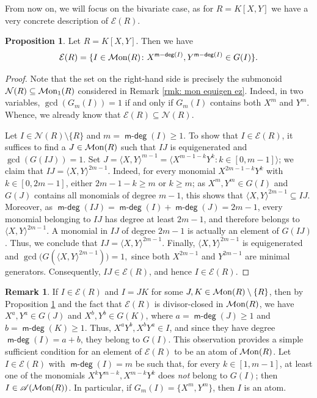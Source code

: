 \documentclass[a4paper,10pt,reqno]{amsart}
\theoremstyle{definition}
\newtheorem{proposition}[theorem]{Proposition}
\theoremstyle{definition}
\newtheorem{remark}[theorem]{Remark}
\providecommand\Mon{{\mathcal{M}{\rm on}}}
\DeclareMathOperator{\mdeg}{\mathsf {m-deg}}
\begin{document}
From now on, we will focus on the bivariate case, as for $R=K[X,Y]$ we have a very concrete description of $\mathcal E(R)$.

\begin{proposition}\label{prop: mon equigen bivar}
    Let $R=K[X,Y]$. Then we have
    \[ \mathcal E(R) = \{ I\in\Mon(R)\colon X^{\mdeg(I)},Y^{\mdeg(I)}\in G(I) \}. \]
\end{proposition}
\begin{proof}
    Note that the set on the right-hand side is precisely the submonoid $\mathcal N(R)\subseteq \Mon_1(R)$ considered in Remark \ref{rmk: mon equigen ez}. Indeed, in two variables, $\gcd(G_m(I))=1$ if and only if $G_m(I)$ contains both $X^m$ and $Y^m$. Whence, we already know that $\mathcal E(R)\subseteq\mathcal N(R)$. 

    Let $I\in\mathcal N(R)\setminus\{R\}$ and $m=\mdeg(I)\ge 1$. To show that $I\in\mathcal E(R)$, it suffices to find a $J\in\Mon(R)$ such that $IJ$ is equigenerated and $\gcd(G(IJ))=1$. Set  $J=\langle X,Y\rangle^{m-1}=\langle X^{m-1-k}Y^k\colon k\in [0,m-1]\rangle$; we claim that $IJ=\langle X,Y\rangle^{2m-1}$. Indeed, for every monomial $X^{2m-1-k}Y^k$ with $k\in [0,2m-1]$, either $2m-1-k\ge m$ or $k\ge m$;
    as $X^m,Y^m\in G(I)$ and $G(J)$ contains all monomials %
    of degree $m-1$, this shows that $\langle X,Y\rangle^{2m-1}\subseteq IJ$. Moreover, as $\mdeg(IJ)=\mdeg(I)+\mdeg(J)=2m-1$, every monomial belonging to $IJ$ has degree at least $2m-1$, and therefore belongs to $\langle X,Y\rangle^{2m-1}$. A monomial in $IJ$ of degree $2m-1$ is actually an element of $G(IJ)$. Thus,
    we conclude that $IJ=\langle X,Y\rangle^{2m-1}$. Finally, $\langle X,Y\rangle^{2m-1}$ is equigenerated and $\gcd\bigl(G(\langle X,Y\rangle^{2m-1})\bigr)=1,$ since both $X^{2m-1}$ and $Y^{2m-1}$ are minimal generators. Consequently, $IJ\in\mathcal E(R)$, and hence $I\in\mathcal E(R)$.
\end{proof}

\begin{remark}\label{rmk: diagonal atoms}
    If $I\in\mathcal E(R)$ and $I=JK$ for some $J,K\in\Mon(R)\setminus\{R\}$, then by Proposition \ref{prop: mon equigen bivar} and the fact that $\mathcal E(R)$ is divisor-closed in $\Mon(R)$, we have $X^a,Y^a\in G(J)$ and $X^b,Y^b\in G(K)$, where $a=\mdeg(J)\ge 1$ and $b=\mdeg(K)\ge 1$. Thus, $X^aY^b,X^bY^a\in I$, and since they have degree
$\mdeg(I)=a+b$, they belong to $G(I)$. This observation provides a simple sufficient condition for an element of $\mathcal E(R)$ to be an atom of $\Mon(R)$. Let $I\in\mathcal E(R)$ with $\mdeg(I)=m$ be such that, for every $k\in [1,m-1]$, at least one of the monomials $X^k Y^{m-k},X^{m-k}Y^k$ does \emph{not} belong to $G(I)$; then $I\in\mathscr A(\Mon(R))$. In particular, if $G_m(I) = \{X^m,Y^m\}$, then $I$ is an atom.
\end{remark}
\end{document}
